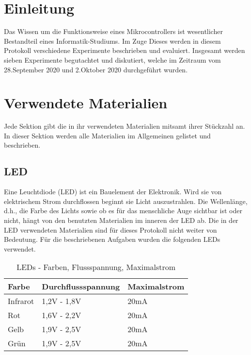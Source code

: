 \section{Einleitung}
\label{sec:einleitung}

Das Wissen um die Funktionsweise eines Mikrocontrollers ist wesentlicher Bestandteil eines Informatik-Studiums.
Im Zuge Dieses werden in diesem Protokoll verschiedene Experimente beschrieben und evaluiert.
Insgesamt werden sieben Experimente begutachtet und diskutiert, welche im Zeitraum vom 28.September 2020 und 2.Oktober 2020 durchgeführt wurden.


\section{Verwendete Materialien}
\label{sec:verwendete-materialien}

Jede Sektion gibt die in ihr verwendeten Materialien mitsamt ihrer Stückzahl an.
In dieser Sektion werden alle Materialien im Allgemeinen gelistet und beschrieben.

\subsection{LED}
\label{subsec:led}
Eine Leuchtdiode (LED) ist ein Bauelement der Elektronik.
Wird sie von elektrischem Strom durchflossen beginnt sie Licht auszustrahlen.
Die Wellenlänge, d.h., die Farbe des Lichts sowie ob es für das menschliche Auge sichtbar ist oder nicht, hängt von den benutzten Materialien im inneren der LED ab.
Die in der LED verwendeten Materialien sind für dieses Protokoll nicht weiter von Bedeutung.
Für die beschriebenen Aufgaben wurden die folgenden LEDs verwendet.

\begin{table}[h]
    \centering
    \caption{LEDs - Farben, Flussspannung, Maximalstrom \cite{led-elektrische-eigenschaften}}
    \label{tab:leds-farben-und-elemente}
    \begin{tabular}{| l | l | l |}
        \hline
        Farbe & Durchflussspannung & Maximalstrom \\
        \hline
        Infrarot   & 1,2V - 1,8V        & 20mA         \\
        Rot   & 1,6V - 2,2V        & 20mA         \\
        Gelb  & 1,9V - 2,5V        & 20mA         \\
        Grün  & 1,9V - 2,5V        & 20mA         \\
        \hline
    \end{tabular}
\end{table}

